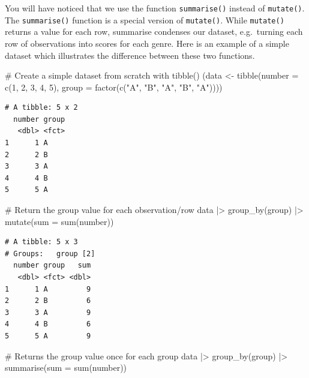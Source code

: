 \documentclass[
  letterpaper,
]{krantz}
\makeatletter
\newenvironment{Shaded}{\begin{snugshade}}{\end{snugshade}}
\newcommand{\AttributeTok}[1]{\textcolor[rgb]{0.40,0.45,0.13}{#1}}
\newcommand{\CommentTok}[1]{\textcolor[rgb]{0.37,0.37,0.37}{#1}}
\newcommand{\DecValTok}[1]{\textcolor[rgb]{0.68,0.00,0.00}{#1}}
\newcommand{\FunctionTok}[1]{\textcolor[rgb]{0.28,0.35,0.67}{#1}}
\newcommand{\NormalTok}[1]{\textcolor[rgb]{0.00,0.23,0.31}{#1}}
\newcommand{\OtherTok}[1]{\textcolor[rgb]{0.00,0.23,0.31}{#1}}
\newcommand{\SpecialCharTok}[1]{\textcolor[rgb]{0.37,0.37,0.37}{#1}}
\newcommand{\StringTok}[1]{\textcolor[rgb]{0.13,0.47,0.30}{#1}}
\newenvironment{kframe}{%
\medskip{}
\setlength{\fboxsep}{.8em}
 \def\at@end@of@kframe{}%
 \ifinner\ifhmode%
  \def\at@end@of@kframe{\end{minipage}}%
  \begin{minipage}{\columnwidth}%
 \fi\fi%
 \def\FrameCommand##1{\hskip\@totalleftmargin \hskip-\fboxsep
 \colorbox{shadecolor}{##1}\hskip-\fboxsep
     \hskip-\linewidth \hskip-\@totalleftmargin \hskip\columnwidth}%
 \MakeFramed {\advance\hsize-\width
   \@totalleftmargin\z@ \linewidth\hsize
   \@setminipage}}%
 {\par\unskip\endMakeFramed%
 \at@end@of@kframe}
\renewenvironment{Shaded}{\begin{kframe}}{\end{kframe}}
\makeatother
\begin{document}
You will have noticed that we use the function \texttt{summarise()}
instead of \texttt{mutate()}. The \texttt{summarise()} function is a
special version of \texttt{mutate()}. While \texttt{mutate()} returns a
value for each row, summarise condenses our dataset, e.g.~turning each
row of observations into scores for each genre. Here is an example of a
simple dataset which illustrates the difference between these two
functions.

\begin{Shaded}
\begin{Highlighting}[]
\CommentTok{\# Create a simple dataset from scratch with tibble()}
\NormalTok{(data }\OtherTok{\textless{}{-}} \FunctionTok{tibble}\NormalTok{(}\AttributeTok{number =} \FunctionTok{c}\NormalTok{(}\DecValTok{1}\NormalTok{, }\DecValTok{2}\NormalTok{, }\DecValTok{3}\NormalTok{, }\DecValTok{4}\NormalTok{, }\DecValTok{5}\NormalTok{),}
               \AttributeTok{group =} \FunctionTok{factor}\NormalTok{(}\FunctionTok{c}\NormalTok{(}\StringTok{"A"}\NormalTok{, }\StringTok{"B"}\NormalTok{, }\StringTok{"A"}\NormalTok{, }\StringTok{"B"}\NormalTok{, }\StringTok{"A"}\NormalTok{))))}
\end{Highlighting}
\end{Shaded}

\begin{verbatim}
# A tibble: 5 x 2
  number group
   <dbl> <fct>
1      1 A    
2      2 B    
3      3 A    
4      4 B    
5      5 A    
\end{verbatim}

\begin{Shaded}
\begin{Highlighting}[]
\CommentTok{\# Return the group value for each observation/row}
\NormalTok{data }\SpecialCharTok{|\textgreater{}}
  \FunctionTok{group\_by}\NormalTok{(group) }\SpecialCharTok{|\textgreater{}}
  \FunctionTok{mutate}\NormalTok{(}\AttributeTok{sum =} \FunctionTok{sum}\NormalTok{(number))}
\end{Highlighting}
\end{Shaded}

\begin{verbatim}
# A tibble: 5 x 3
# Groups:   group [2]
  number group   sum
   <dbl> <fct> <dbl>
1      1 A         9
2      2 B         6
3      3 A         9
4      4 B         6
5      5 A         9
\end{verbatim}

\begin{Shaded}
\begin{Highlighting}[]
\CommentTok{\# Returns the group value once for each group}
\NormalTok{data }\SpecialCharTok{|\textgreater{}}
  \FunctionTok{group\_by}\NormalTok{(group) }\SpecialCharTok{|\textgreater{}}
  \FunctionTok{summarise}\NormalTok{(}\AttributeTok{sum =} \FunctionTok{sum}\NormalTok{(number))}
\end{Highlighting}
\end{Shaded}
\end{document}
